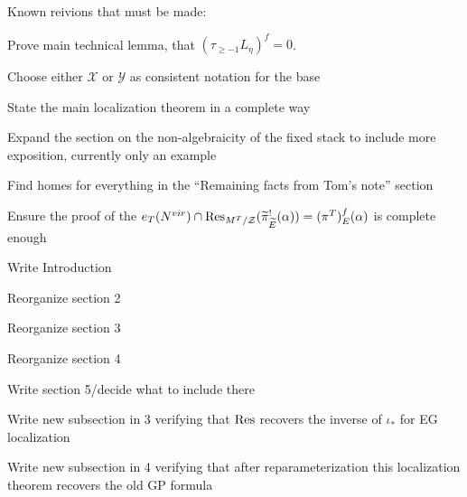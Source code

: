\documentclass[12pt,dvipsnames]{amsart}
\begin{document}
Known reivions that must be made:
\begin{todolist}
  \item Prove main technical lemma, that \((\tau_{\geq -1}L_\eta)^f = 0\).
  \item Choose either \(\mathcal X\) or \(\mathcal Y\) as consistent notation for the base
  \item State the main localization theorem in a complete way
  \item Expand the section on the non-algebraicity of the fixed stack to include more exposition, currently only an example
  \item Find homes for everything in the ``Remaining facts from Tom's note'' section
  \item Ensure the proof of the \(e_T(N^{vir})\cap \operatorname{Res}_{M^T/\mathcal Z}(\widetilde \pi^!_{\widetilde E}(\alpha)) = (\pi^T)^f_{E}(\alpha)\) is complete enough
  \item Write Introduction
  \item Reorganize section 2
  \item Reorganize section 3
  \item Reorganize section 4
  \item Write section 5/decide what to include there
  \item Write new subsection in 3 verifying that $\operatorname{Res}$ recovers the inverse of \(\iota_*\) for EG localization
  \item Write new subsection in 4 verifying that after reparameterization this localization theorem recovers the old GP formula
\end{todolist}

\newpage






\end{document}
